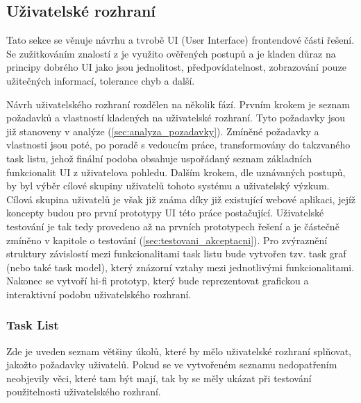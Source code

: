 \documentclass[thesis=M,czech]{FITthesis}[2012/06/26]
\begin{document}
\subsection{Uživatelské rozhraní}
Tato sekce se věnuje návrhu a tvrobě UI (User Interface) frontendové části řešení. Se zužitkováním znalostí z \cite{nur} je využito ověřených postupů a je kladen důraz na principy dobrého UI jako jsou jednolitost, předpovídatelnost, zobrazování pouze užitečných informací, tolerance chyb a další. 

Návrh uživatelského rozhraní rozdělen na několik fází. Prvním krokem je seznam požadavků a vlastností kladených na uživatelské rozhraní. Tyto požadavky jsou již stanoveny v analýze (\ref{sec:analyza_pozadavky}). Zmíněné požadavky a vlastnosti jsou poté, po poradě s vedoucím práce, transformovány do takzvaného task listu, jehož finální podoba obsahuje uspořádaný seznam základních funkcionalit UI z uživatelova pohledu. Dalším krokem, dle uznávaných postupů, by byl výběr cílové skupiny uživatelů tohoto systému a uživatelský výzkum. Cílová skupina uživatelů je však již známa díky již existující webové aplikaci, jejíž koncepty budou pro první prototypy UI této práce postačující. Uživatelské testování je tak tedy provedeno až na prvních prototypech řešení a je částečně zmíněno v kapitole o testování (\ref{sec:testovani_akceptacni}). Pro zvýraznění struktury závislostí mezi funkcionalitami task listu bude vytvořen tzv. task graf (nebo také task model), který znázorní vztahy mezi jednotlivými funkcionalitami. Nakonec se vytvoří hi-fi prototyp, který bude reprezentovat grafickou a interaktivní podobu uživatelského rozhraní.

\subsubsection{Task List} \label{subsubsec:navrh_frontend_ui_tasklist}
Zde je uveden seznam většiny úkolů, které by mělo uživatelské rozhraní splňovat, jakožto požadavky uživatelů. Pokud se ve vytvořeném seznamu nedopatřením neobjevily věci, které tam být mají, tak by se měly ukázat při testování použitelnosti uživatelského rozhraní.
\end{document}
